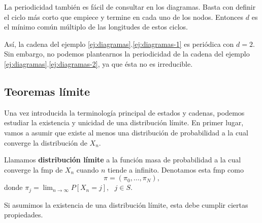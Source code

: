 \begin{observacion}
    La periodicidad también es fácil de consultar en los diagramas. Basta con definir el ciclo más corto que empiece y termine en cada uno de los nodos. Entonces $d$ es el mínimo común múltiplo de las longitudes de estos ciclos.
\end{observacion}

Así, la cadena del ejemplo \ref{ej:diagramas}.\ref{ej:diagramas-1} es periódica con $d=2$. Sin embargo, no podemos plantearnos la periodicidad de la cadena del ejemplo \ref{ej:diagramas}.\ref{ej:diagramas-2}, ya que ésta no es irreducible.

\subsection{Teoremas límite}

Una vez introducida la terminología principal de estados y cadenas, podemos estudiar la existencia y unicidad de una distribución límite. En primer lugar, vamos a asumir que existe al menos una distribución de probabilidad a la cual converge la distribución de $X_n$.

\begin{definicion}
    Llamamos \textbf{distribución límite} a la función masa de probabilidad a la cual converge la fmp de $X_n$ cuando $n$ tiende a infinito. Denotamos esta fmp como
    \begin{equation}
        \label{eq:distr-limite}
        \pi = (\pi_0,\dots,\pi_N)   ,
    \end{equation}
    donde $\pi_j=\displaystyle\lim_{n\rightarrow\infty} P[X_n=j], \ \ \ j\in S$.
\end{definicion}

Si asumimos la existencia de una distribución límite, esta debe cumplir ciertas propiedades.

